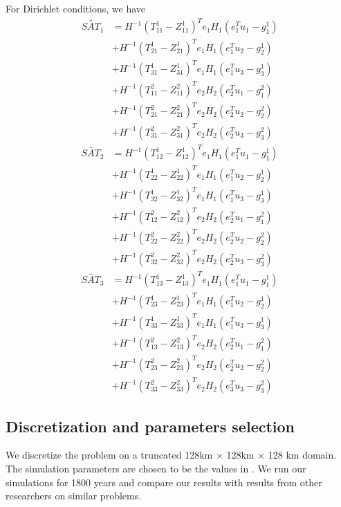 For Dirichlet conditions, we have
\begin{align}
    \tilde{SAT_1} &= H^{-1} (T_{11}^1 - Z_{11}^1)^T e_1 H_1 (e_1^T u_1 - g_1^1) \nonumber \\
    &+ H^{-1} (T_{21}^1 - Z_{21}^1)^T e_1 H_1 (e_1^T u_2 - g_2^1) \nonumber\\ 
    &+ H^{-1} (T_{31}^1 - Z_{31}^1)^T e_1 H_1 (e_1^T u_3 - g_3^1) \nonumber\\
    &+ H^{-1} (T_{11}^2 - Z_{11}^2)^T e_2 H_2 (e_2^T u_1 - g_1^2) \nonumber\\
    &+ H^{-1} (T_{21}^2 - Z_{21}^2)^T e_2 H_2 (e_2^T u_2 - g_2^2) \nonumber\\
    &+ H^{-1} (T_{31}^2 - Z_{31}^2)^T e_2 H_2 (e_2^T u_3 - g_3^2) \\
    \tilde{SAT_2} &= H^{-1} (T_{12}^1 - Z_{12}^1)^T e_1 H_1 (e_1^T u_1 - g_1^1) \nonumber \\
    & + H^{-1} (T_{22}^1 - Z_{22}^1)^T e_1 H_1 (e_1^T u_2 - g_2^1) \nonumber \\
    & + H^{-1} (T_{32}^1 - Z_{32}^1)^T e_1 H_1 (e_1^T u_3 - g_3^1) \nonumber \\
    & + H^{-1} (T_{12}^2 - Z_{12}^2)^T e_2 H_2 (e_2^T u_1 - g_1^2) \nonumber \\
    & + H^{-1} (T_{22}^2 - Z_{22}^2)^T e_2 H_2 (e_2^T u_2 - g_2^2) \nonumber \\ 
    & + H^{-1} (T_{32}^2 - Z_{32}^2)^T e_2 H_2 (e_2^T u_3 - g_3^2) \\
    \tilde{SAT_3} &= H^{-1} (T_{13}^1 - Z_{13}^1)^T e_1 H_1 (e_1^T u_1 - g_1^1) \nonumber \\
    & + H^{-1} (T_{23}^1 - Z_{23}^1)^T e_1 H_1 (e_1^T u_2 - g_2^1) \nonumber \\ 
    & + H^{-1} (T_{33}^1 - Z_{33}^1)^T e_1 H_1 (e_1^T u_3 - g_3^1) \nonumber \\
    & + H^{-1} (T_{13}^2 - Z_{13}^2)^T e_2 H_2 (e_2^T u_1 - g_1^2) \nonumber \\
    & + H^{-1} (T_{23}^2 - Z_{23}^2)^T e_2 H_2 (e_2^T u_2 - g_2^2) \nonumber \\
    & + H^{-1} (T_{33}^2 - Z_{33}^2)^T e_2 H_2 (e_3^T u_3 - g_3^2)
    \label{eqn:dirichlet-condition}
\end{align}


\subsection{Discretization and parameters selection}
We discretize the problem on a truncated 128km $\times$ 128km $\times$ 128 km domain. The simulation parameters are chosen to be the values in \cite{jiang2020seas}. We run our simulations for 1800 years and compare our results with results from other researchers on similar problems.

